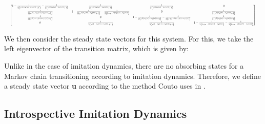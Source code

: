 \documentclass{article}
\begin{document}
\begin{equation}
\resizebox{\textwidth}{!}{$
\begin{bmatrix}
    1 - \frac{1}{2\left(e^{\beta\left(\pi_{2}(a) - \pi_{2}(b)\right)} + 1\right)} - \frac{1}{2\left(e^{\beta\left(\pi_{1}(a) - \pi_{1}(c)\right)} + 1\right)} 
    & \frac{1}{2\left(e^{\beta\left(\pi_{2}(a) - \pi_{2}(b)\right)} + 1\right)} 
    & \frac{1}{2\left(e^{\beta\left(\pi_{1}(a) - \pi_{1}(c)\right)} + 1\right)} 
    & 0 \\[6pt]

    \frac{1}{2\left(e^{\beta\left(- \pi_{2}(a) + \pi_{2}(b)\right)} + 1\right)} 
    & 1 - \frac{1}{2\left(e^{\beta\left(\pi_{1}(b) - \pi_{1}(d)\right)} + 1\right)} - \frac{1}{2\left(1 + e^{-\beta\left(\pi_{2}(a) - \pi_{2}(b)\right)}\right)} 
    & 0 
    & \frac{1}{2\left(e^{\beta\left(\pi_{1}(b) - \pi_{1}(d)\right)} + 1\right)} \\[6pt]

    \frac{1}{2\left(e^{\beta\left(- \pi_{1}(a) + \pi_{1}(c)\right)} + 1\right)} 
    & 0 
    & 1 - \frac{1}{2\left(e^{\beta\left(\pi_{2}(c) - \pi_{2}(d)\right)} + 1\right)} - \frac{1}{2\left(1 + e^{-\beta\left(\pi_{1}(a) - \pi_{1}(c)\right)}\right)} 
    & \frac{1}{2\left(e^{\beta\left(\pi_{2}(c) - \pi_{2}(d)\right)} + 1\right)} \\[6pt]

    0 
    & \frac{1}{2\left(e^{\beta\left(- \pi_{1}(b) + \pi_{1}(d)\right)} + 1\right)} 
    & \frac{1}{2\left(e^{\beta\left(- \pi_{2}(c) + \pi_{2}(d)\right)} + 1\right)} 
    & 1 - \frac{1}{2\left(1 + e^{-\beta\left(\pi_{2}(c) - \pi_{2}(d)\right)}\right)} - \frac{1}{2\left(1 + e^{-\beta\left(\pi_{1}(b) - \pi_{1}(d)\right)}\right)}
\end{bmatrix}$
}
\label{eqn:2x2_Introspection_Transition}
\end{equation}

We then consider the steady state vectors for this system.
For this, we take the left eigenvector of the transition matrix, which is given by:




Unlike in the case of imitation dynamics, there are no absorbing states for a Markov chain transitioning according to imitation dynamics.
Therefore, we define a steady state vector \textbf{u} according to the method Couto uses in \cite{Couto2022}. 



\subsection*{Introspective Imitation Dynamics}
\end{document}
